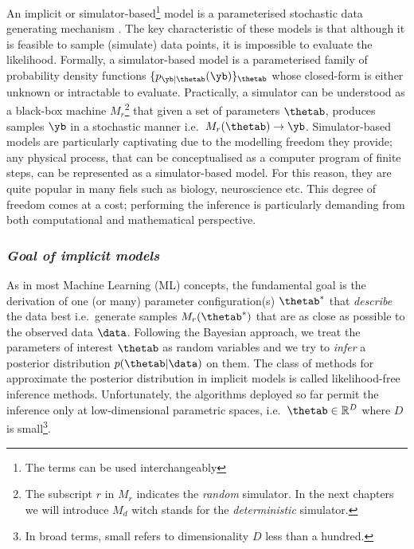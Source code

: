 An implicit or simulator-based\footnote{The terms can be used
  interchangeably} model is a parameterised stochastic data generating
mechanism \cite{Gutmann2016}. The key characteristic of these models
is that although it is feasible to sample (simulate) data points, it
is impossible to evaluate the likelihood. Formally, a simulator-based
model is a parameterised family of probability density functions
$\{ p_{\yb|\thetab}(\yb) \}_{\thetab}$ whose closed-form is either
unknown or intractable to evaluate. Practically, a simulator can be
understood as a black-box machine $M_r$\footnote{The subscript $r$ in
  $M_r$ indicates the \textit{random} simulator. In the next chapters
  we will introduce $M_d$ witch stands for the \textit{deterministic}
  simulator.} that given a set of parameters $\thetab$, produces
samples $\yb$ in a stochastic manner i.e.\
$M_r(\thetab) \rightarrow \yb$. Simulator-based models are
particularly captivating due to the modelling freedom they provide;
any physical process, that can be conceptualised as a computer program
of finite steps, can be represented as a simulator-based model. For
this reason, they are quite popular in many fiels such as biology,
neuroscience etc. This degree of freedom comes at a cost; performing
the inference is particularly demanding from both computational and
mathematical perspective. 

\subsubsection*{\textit{Goal of implicit models}}

As in most Machine Learning (ML) concepts, the fundamental goal is the
derivation of one (or many) parameter configuration(s) $\thetab^*$
that \textit{describe} the data best i.e.\ generate samples
$M_r(\thetab^*)$ that are as close as possible to the observed data
$\data$. Following the Bayesian approach, we treat the parameters of
interest $\thetab$ as random variables and we try to \textit{infer} a
posterior distribution $p(\thetab|\data)$ on them. The class of
methods for approximate the posterior distribution in implicit models
is called likelihood-free inference methods. Unfortunately, the
algorithms deployed so far permit the inference only at
low-dimensional parametric spaces, i.e.\ $\thetab \in \mathbb{R}^D$
where $D$ is small\footnote{In broad terms, small refers to
  dimensionality $D$ less than a hundred.}.
